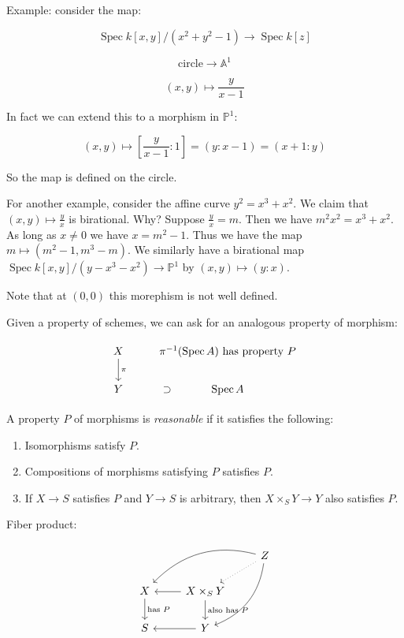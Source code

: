 \documentclass{article}
\theoremstyle{definition}
\begin{document}
    Example: consider the map:

    \[
        \operatorname{Spec} k[x,y] / (x^2 + y^2 - 1) \to \operatorname{Spec} k[z]
    \]

    \[
        \text{circle} \to \mathbb{A}^1
    \]

    \[
        (x,y) \mapsto \frac{y}{x-1}
    \]

    In fact we can extend this to a morphism in \(\mathbb{P}^1\):

    \[
        (x,y) \mapsto \left[ \frac{y}{x-1}:1 \right] = (y : x-1) = (x+1 : y)
    \]

    So the map is defined on the circle.

    For another example, consider the affine curve \(y^2 = x^3 + x^2\). We claim that \((x,y) \mapsto \frac{y}{x}\) is birational. Why? Suppose \(\frac{y}{x}=m\). Then we have \(m^2 x^2 = x^3 + x^2\). As long as \(x\neq 0\) we have \(x = m^2 - 1\). Thus we have the map \(m \mapsto (m^2 - 1, m^3 - m)\). We similarly have a birational map \(\operatorname{Spec} k[x,y] / (y - x^3 - x^2) \to\mathbb{P}^1\) by \((x,y) \mapsto (y : x)\). 

    Note that at \((0,0)\) this morephism is not well defined.

    Given a property of schemes, we can ask for an analogous property of morphism:

    \[
        \begin{tikzcd}
            X \ar[d,"\pi"] & \pi ^{-1} (\operatorname{Spec} A) \text{ has property } P \\ Y & \operatorname{Spec} A \ar[l, "\supset", phantom, sloped]
        \end{tikzcd}
    \]

    A property \(P\) of morphisms is \textit{reasonable} if it satisfies the following:

    \begin{enumerate}[label=\roman*)]
        \item Isomorphisms satisfy \(P\).
        \item Compositions of morphisms satisfying \(P\) satisfies \(P\). 
        \item If \(X \to S\) satisfies \(P\) and \(Y \to S\) is arbitrary, then \(X \times_S Y \to Y\) also satisfies \(P\).
    \end{enumerate} 

    Fiber product:

    \[
        \begin{tikzcd}
            & & Z \ar[lld, bend right] \ar[ldd, bend left] \ar[ld, dotted] \\ X \ar[d,"\text{has }P"] & X \times_S Y \ar[l] \ar[d, "\text{also has }P"] \\ S & Y \ar[l]
        \end{tikzcd}
    \]
\end{document}
